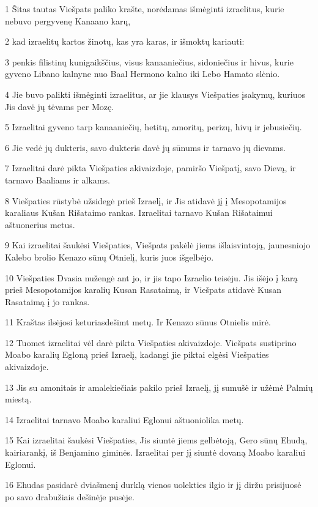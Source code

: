 \par 1 Šitas tautas Viešpats paliko krašte, norėdamas išmėginti izraelitus, kurie nebuvo pergyvenę Kanaano karų, 
\par 2 kad izraelitų kartos žinotų, kas yra karas, ir išmoktų kariauti: 
\par 3 penkis filistinų kunigaikščius, visus kanaaniečius, sidoniečius ir hivus, kurie gyveno Libano kalnyne nuo Baal Hermono kalno iki Lebo Hamato slėnio. 
\par 4 Jie buvo palikti išmėginti izraelitus, ar jie klausys Viešpaties įsakymų, kuriuos Jis davė jų tėvams per Mozę. 
\par 5 Izraelitai gyveno tarp kanaaniečių, hetitų, amoritų, perizų, hivų ir jebusiečių. 
\par 6 Jie vedė jų dukteris, savo dukteris davė jų sūnums ir tarnavo jų dievams. 
\par 7 Izraelitai darė pikta Viešpaties akivaizdoje, pamiršo Viešpatį, savo Dievą, ir tarnavo Baaliams ir alkams. 
\par 8 Viešpaties rūstybė užsidegė prieš Izraelį, ir Jis atidavė jį į Mesopotamijos karaliaus Kušan Rišataimo rankas. Izraelitai tarnavo Kušan Rišataimui aštuonerius metus. 
\par 9 Kai izraelitai šaukėsi Viešpaties, Viešpats pakėlė jiems išlaisvintoją, jaunesniojo Kalebo brolio Kenazo sūnų Otnielį, kuris juos išgelbėjo. 
\par 10 Viešpaties Dvasia nužengė ant jo, ir jis tapo Izraelio teisėju. Jis išėjo į karą prieš Mesopotamijos karalių Kusan Rasataimą, ir Viešpats atidavė Kusan Rasataimą į jo rankas. 
\par 11 Kraštas ilsėjosi keturiasdešimt metų. Ir Kenazo sūnus Otnielis mirė. 
\par 12 Tuomet izraelitai vėl darė pikta Viešpaties akivaizdoje. Viešpats sustiprino Moabo karalių Egloną prieš Izraelį, kadangi jie piktai elgėsi Viešpaties akivaizdoje. 
\par 13 Jis su amonitais ir amalekiečiais pakilo prieš Izraelį, jį sumušė ir užėmė Palmių miestą. 
\par 14 Izraelitai tarnavo Moabo karaliui Eglonui aštuoniolika metų. 
\par 15 Kai izraelitai šaukėsi Viešpaties, Jis siuntė jiems gelbėtoją, Gero sūnų Ehudą, kairiarankį, iš Benjamino giminės. Izraelitai per jį siuntė dovaną Moabo karaliui Eglonui. 
\par 16 Ehudas pasidarė dviašmenį durklą vienos uolekties ilgio ir jį diržu prisijuosė po savo drabužiais dešinėje pusėje. 

